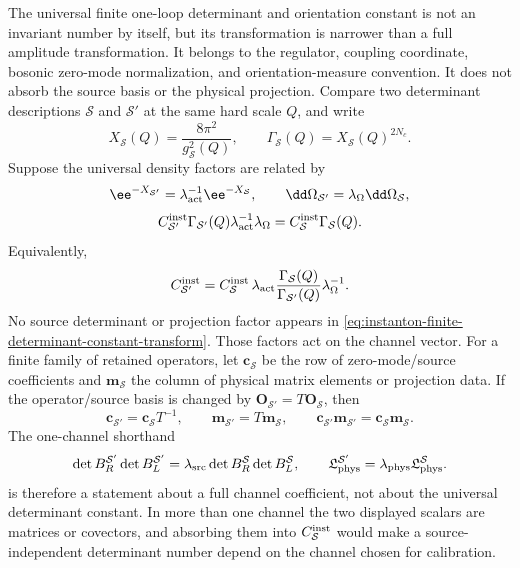 \begin{remark}
\label{rem:instanton-finite-determinant-scheme-transport-architecture}
The universal finite one-loop determinant and orientation constant is not an
invariant number by itself, but its transformation is narrower than a full
amplitude transformation.  It belongs to the regulator, coupling coordinate,
bosonic zero-mode normalization, and orientation-measure convention.  It does
not absorb the source basis or the physical projection.  Compare two
determinant descriptions \({\mathcal S}\) and \({\mathcal S}'\) at the same hard
scale \(Q\), and write
\[
  X_{\mathcal S}(Q)=\frac{8\pi^2}{g_{\mathcal S}^2(Q)},
  \qquad
  \Gamma_{\mathcal S}(Q)=X_{\mathcal S}(Q)^{2N_c}.
\]
Suppose the universal density factors are related by
\[
  \ee^{-X_{{\mathcal S}'}}=\lambda_{\rm act}^{-1}\ee^{-X_{\mathcal S}},
  \qquad
  \dd\Omega_{{\mathcal S}'}=\lambda_{\Omega}\dd\Omega_{\mathcal S},
\]
\[
  C_{{\mathcal S}'}^{\rm inst}
  \Gamma_{{\mathcal S}'}(Q)
  \lambda_{\rm act}^{-1}
  \lambda_{\Omega}
  =
  C_{\mathcal S}^{\rm inst}\Gamma_{\mathcal S}(Q).
\]
Equivalently,
\begin{equation}
  C_{{\mathcal S}'}^{\rm inst}
  =
  C_{\mathcal S}^{\rm inst}\,
  \lambda_{\rm act}
  \frac{\Gamma_{\mathcal S}(Q)}{\Gamma_{{\mathcal S}'}(Q)}
  \lambda_{\Omega}^{-1}.
  \label{eq:instanton-finite-determinant-constant-transform}
\end{equation}
No source determinant or projection factor appears in
\eqref{eq:instanton-finite-determinant-constant-transform}.  Those factors act
on the channel vector.  For a finite family of retained operators, let
\(\mathbf c_{\mathcal S}\) be the row of zero-mode/source coefficients and
\(\mathbf m_{\mathcal S}\) the column of physical matrix elements or projection
data.  If the operator/source basis is changed by
\(\mathbf O_{{\mathcal S}'}=T\mathbf O_{\mathcal S}\), then
\begin{equation}
  \mathbf c_{{\mathcal S}'}=\mathbf c_{\mathcal S}T^{-1},
  \qquad
  \mathbf m_{{\mathcal S}'}=T\mathbf m_{\mathcal S},
  \qquad
  \mathbf c_{{\mathcal S}'}\mathbf m_{{\mathcal S}'}
  =
  \mathbf c_{\mathcal S}\mathbf m_{\mathcal S}.
  \label{eq:instanton-source-projection-covariance}
\end{equation}
The one-channel shorthand
\[
  \det B_R^{{\mathcal S}'}\det B_L^{{\mathcal S}'}
  =
  \lambda_{\rm src}\det B_R^{\mathcal S}\det B_L^{\mathcal S},
  \qquad
  \mathfrak L_{\rm phys}^{{\mathcal S}'}
  =
  \lambda_{\rm phys}\mathfrak L_{\rm phys}^{\mathcal S}.
\]
is therefore a statement about a full channel coefficient, not about the
universal determinant constant.  In more than one channel the two displayed
scalars are matrices or covectors, and absorbing them into
\(C_{\mathcal S}^{\rm inst}\) would make a source-independent determinant
number depend on the channel chosen for calibration.


\end{remark}
